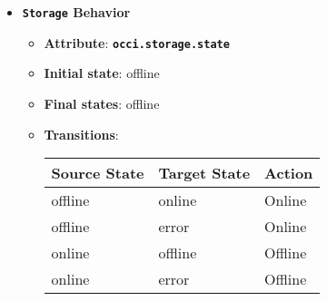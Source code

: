\begin{itemize}
\item \textbf{\texttt{Storage} Behavior}
\begin{itemize}
\item \textbf{Attribute}: \textbf{\texttt{occi.storage.state}}
\item \textbf{Initial state}: offline
\item \textbf{Final states}:  	offline
\item \textbf{Transitions}:

\begin{center}
\begin{tabular}{|l|l|l|}
  \hline
  \textbf{Source State} & \textbf{Target State} & \textbf{Action} \\
  \hline  
  offline & online & Online  \\
  \hline
  offline & error & Online  \\
  \hline
  online & offline & Offline  \\
  \hline
  online & error & Offline  \\
  \hline
\end{tabular}
\end{center}
\end{itemize}
\end{itemize}


